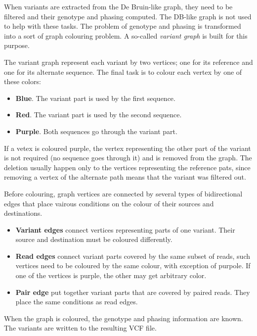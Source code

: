 When variants are extracted from the De Bruin-like graph, they need to be filtered and their genotype and phasing computed. The DB-like graph is not used to help with these tasks. The problem of genotype and phasing is transformed into a sort of graph colouring problem. A so-called \textit{variant graph} is built for this purpose.

The variant graph represent each variant by two vertices; one for its reference and one for its alternate sequence. The final task is to colour each vertex by one of these colors:
\begin{itemize}
\item \textbf{Blue}. The variant part is used by the first sequence.
\item \textbf{Red}. The variant part is used by the second sequence.
\item \textbf{Purple}. Both sequences go through the variant part.
\end{itemize}

If a vetex is coloured purple, the vertex representing the other part of the variant is not required (no sequence goes through it) and is removed from the graph. The deletion usually happen only to the vertices representing the reference pats, since removing a vertex of the alternate path means that the variant was filtered out.

Before colouring, graph vertices are connected by several types of bidirectional edges that place vairous conditions on the colour of their sources and destinations.
\begin{itemize}
\item \textbf{Variant edges} connect vertices representing parts of one variant. Their source and destination must be coloured differently.
\item \textbf{Read edges} connect variant parts covered by the same subset of reads, such vertices need to be coloured by the same colour, with exception of purpole. If one of the vertices is purple, the other may get arbitrary color.
\item \textbf{Pair edge} put together variant parts that are covered by paired reads. They place the same conditions as read edges.
\end{itemize}

When the graph is coloured, the genotype and phasing information are known. The variants are written to the resulting VCF file.